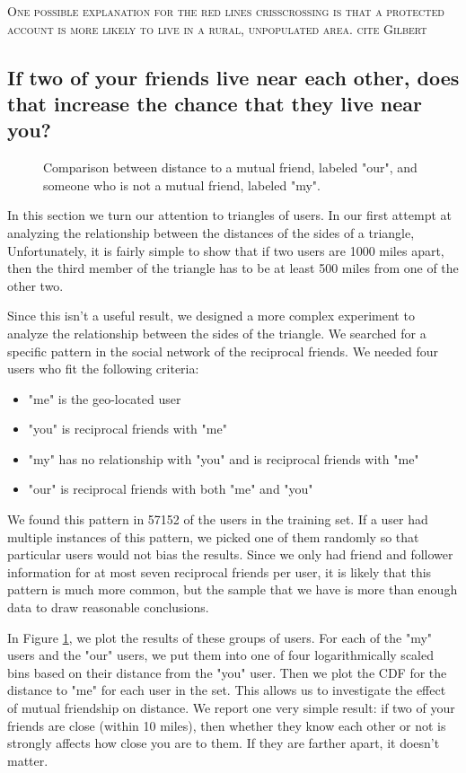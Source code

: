 \documentclass{sig-alternate}
\begin{document}
\textsc{One possible explanation for the red lines crisscrossing is that a
protected account is more likely to live in a rural, unpopulated area. cite
Gilbert}

\subsection{If two of your friends live near each other, does that increase the chance that they live near you?}
\begin{figure}
\centering
{}
\caption{
Comparison between distance to a mutual friend, labeled "our", and someone who is not a mutual friend, labeled "my".
}
\label{fig:NearTriads}
\end{figure}
In this section we turn our attention to triangles of users.
In our first attempt at analyzing the relationship between the distances of the sides of a triangle, 
Unfortunately, it is fairly simple to show that if two users are 1000 miles apart, then the third member of the triangle has to be at least 500 miles from one of the other two.

Since this isn't a useful result, we designed a more complex experiment to analyze the relationship between the sides of the triangle.
We searched for a specific pattern in the social network of the reciprocal friends.  We needed four users who fit the following criteria:
\begin{itemize}
\item "me" is the geo-located user
\item "you" is reciprocal friends with "me"
\item "my" has no relationship with "you" and is reciprocal friends with "me"
\item "our" is reciprocal friends with both "me" and "you"
\end{itemize}

We found this pattern in 57152 of the users in the training set. If a user had multiple instances of this pattern, we picked one of them randomly so that particular users would not bias the results.
Since we only had friend and follower information for at most seven reciprocal friends per user, it is likely that this pattern is much more common, but the sample that we have is more than enough data to draw reasonable conclusions.

In Figure \ref{fig:NearTriads}, we plot the results of these groups of users.
For each of the "my" users and the "our" users, we put them into one of four logarithmically scaled bins based on their distance from the "you" user. Then we plot the CDF for the distance to "me" for each user in the set. This allows us to investigate the effect of mutual friendship on distance.
We report one very simple result: if two of your friends are close (within 10 miles), then whether they know each other or not is strongly affects how close you are to them. If they are farther apart, it doesn't matter.
\end{document}

